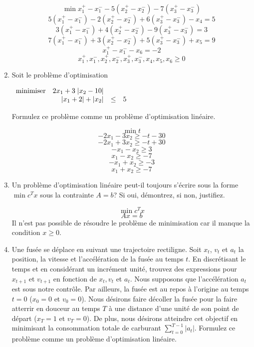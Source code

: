 \begin{enumerate}
    \begin{solution}
      $$\min x_{1}^{+} - x_{1}^{-}-5(x_{2}^{+} - x_{2}^{-})-7(x_{3}^{+} - x_{3}^{-})$$
      $$5(x_{1}^{+} - x_{1}^{-})-2(x_{2}^{+} - x_{2}^{-})+6(x_{3}^{+} - x_{3}^{-}) - x_{4}= 5$$
      $$3(x_{1}^{+} - x_{1}^{-})+4(x_{2}^{+} - x_{2}^{-})-9(x_{3}^{+} - x_{3}^{-}) = 3$$
      $$7(x_{1}^{+} - x_{1}^{-})+3(x_{2}^{+} - x_{2}^{-})+5(x_{3}^{+} - x_{3}^{-}) + x_{5} = 9$$
      $$x_{1}^{+} - x_{1}^{-} - x_{6} = -2 $$
      $$x_{1}^{+}, x_{1}^{-}, x_{2}^{+}, x_{2}^{-}, x_{3}^{+}, x_{3}^{-}, x_{4}, x_{5}, x_{6} \geq 0 $$
    \end{solution}

  \item Soit le problème d'optimisation

    $
    \begin{array}{lrcr}
      \mbox{minimiser}   &  2x_1+3 \; | x_2-10|\\
      & |x_1+2| + |x_2| & \leq & 5
    \end{array}
    $

    Formulez ce problème comme un problème d'optimisation linéaire.

    \begin{solution}
      $$\min t$$
      $$-2x_{1}-3x_{2} \geq -t -30$$
      $$-2x_{1}+3x_{2} \geq -t +30$$
      $$-x_{1} - x_{2} \geq 3$$
      $$x_{1} - x_{2} \geq -7$$
      $$-x_{1} + x_{2} \geq -3$$
      $$x_{1} + x_{2} \geq -7 $$
    \end{solution}


  \item Un problème d'optimisation linéaire peut-il toujours s'écrire sous la forme $\min c^Tx$ sous la contrainte $A = b$? Si oui, démontrez, si non, justifiez.

    \begin{solution}
      $$\min c^{T}x$$
      $$Ax = b$$
      Il n'est pas possible de résoudre le problème de minimisation car il manque la condition $x \geq 0$.
    \end{solution}

  \item Une fusée se déplace en suivant une trajectoire rectiligne. Soit $x_t$, $v_t$
    et $a_t$ la position, la vitesse et l'accélération de la fusée au temps $t$. En discrétisant le temps et en considérant un incrément
    unité, trouvez des expressions pour $x_{t+1}$ et $v_{t+1}$ en fonction de $x_t, v_t$ et $a_t$. Nous supposons que l'accélération $a_t$ est sous notre
    contrôle. Par ailleurs, la fusée est au repos à l'origine au temps
    $t=0$ ($x_0=0$ et
    $v_0=0$). Nous désirons faire décoller la fusée pour la faire atterrir  en douceur au temps $T$ à une
    distance d'une unité de son point de départ ($x_T=1$ et $v_T=0$). De plus, nous désirons atteindre cet
    objectif en minimisant la consommation totale de carburant
    $\sum_{t=0}^{T-1} |a_t|$.  Formulez ce problème comme un problème d'optimisation linéaire.


\end{enumerate}
